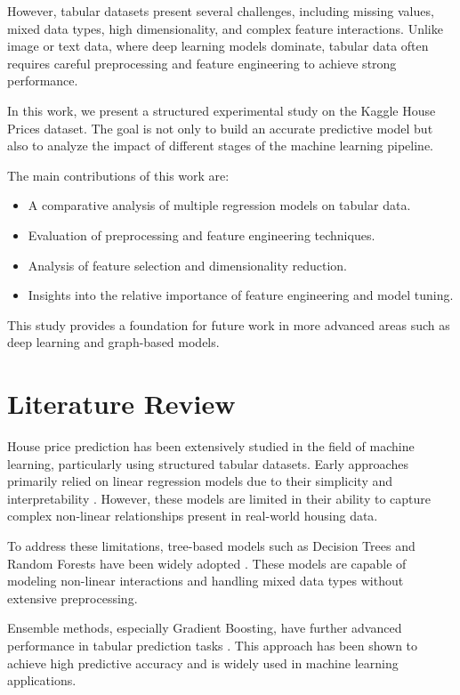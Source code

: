 \documentclass[conference]{IEEEtran}
\begin{document}
However, tabular datasets present several challenges, including missing values, mixed data types, high dimensionality, and complex feature interactions. Unlike image or text data, where deep learning models dominate, tabular data often requires careful preprocessing and feature engineering to achieve strong performance.

In this work, we present a structured experimental study on the Kaggle House Prices dataset. The goal is not only to build an accurate predictive model but also to analyze the impact of different stages of the machine learning pipeline.

The main contributions of this work are:

\begin{itemize}
\item A comparative analysis of multiple regression models on tabular data.
\item Evaluation of preprocessing and feature engineering techniques.
\item Analysis of feature selection and dimensionality reduction.
\item Insights into the relative importance of feature engineering and model tuning.
\end{itemize}

This study provides a foundation for future work in more advanced areas such as deep learning and graph-based models.

\section{Literature Review}

House price prediction has been extensively studied in the field of machine learning, particularly using structured tabular datasets. Early approaches primarily relied on linear regression models due to their simplicity and interpretability \cite{hastie2009elements}. However, these models are limited in their ability to capture complex non-linear relationships present in real-world housing data.

To address these limitations, tree-based models such as Decision Trees and Random Forests have been widely adopted \cite{breiman2001random}. These models are capable of modeling non-linear interactions and handling mixed data types without extensive preprocessing.

Ensemble methods, especially Gradient Boosting, have further advanced performance in tabular prediction tasks \cite{friedman2001greedy}. This approach has been shown to achieve high predictive accuracy and is widely used in machine learning applications.
\end{document}
